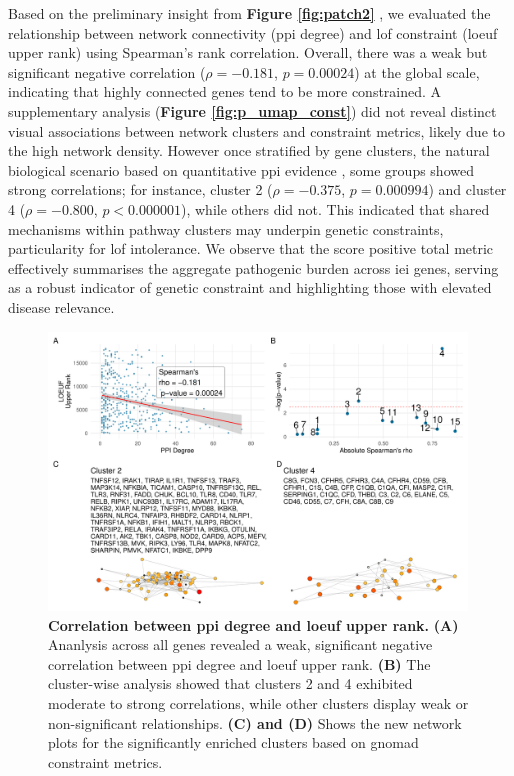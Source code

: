 Based on the preliminary insight from \textbf{Figure \ref{fig:patch2}} ,
we evaluated the relationship between network connectivity (\ac{ppi} degree) and \ac{lof} constraint (\ac{loeuf} upper rank) \citet{karczewski2020mutational} using Spearman’s rank correlation.
Overall, there was a weak but significant negative correlation ($\rho = -0.181$, $p = 0.00024$) at the global scale, indicating that highly connected genes tend to be more constrained. 
A supplementary analysis (\textbf{Figure \ref{fig:p_umap_const}})
did not reveal distinct visual associations between network clusters and constraint metrics, likely due to the high network density. 
However once stratified by gene clusters, the natural biological scenario based on quantitative \ac{ppi} evidence \cite{szklarczyk2025string},
some groups showed strong correlations; for instance, cluster 2 ($\rho = -0.375$, $p = 0.000994$) and cluster 4 ($\rho = -0.800$, $p < 0.000001$), while others did not.
This indicated that shared mechanisms within pathway clusters may underpin genetic constraints, particularity for \ac{lof} intolerance. We observe that the score positive total metric effectively summarises the aggregate pathogenic burden across \ac{iei} genes, serving as a robust indicator of genetic constraint and highlighting those with elevated disease relevance.

\begin{figure}[ht]
  \centering
  \includegraphics[width=0.99\textwidth]{../images/untangleR_ppi_network_p_cor_spear_rho_sig_clust_patch3.pdf}
  \caption{
    \textbf{Correlation between \ac{ppi} degree and \ac{loeuf} upper rank.} 
    \textbf{(A)} Ananlysis across all genes revealed a weak, significant negative correlation between \ac{ppi} degree and \ac{loeuf} upper rank. \textbf{(B)} The cluster-wise analysis showed that clusters 2 and 4 exhibited moderate to strong correlations, while other clusters display weak or non-significant relationships. \textbf{(C) and (D)} Shows the new network plots for the significantly enriched clusters based on \ac{gnomad} constraint metrics.
  }
  \label{fig:p_cor_spear_rho_sig_clust_patch3}
\end{figure}

